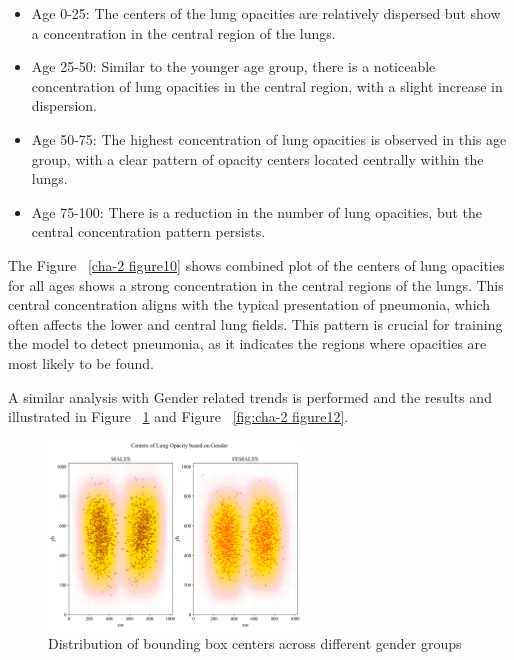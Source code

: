 \begin{itemize}
    \item Age 0-25: The centers of the lung opacities are relatively dispersed but show a concentration in the central region of the lungs.
    \item Age 25-50: Similar to the younger age group, there is a noticeable concentration of lung opacities in the central region, with a slight increase in dispersion.
    \item Age 50-75: The highest concentration of lung opacities is observed in this age group, with a clear pattern of opacity centers located centrally within the lungs.
    \item Age 75-100: There is a reduction in the number of lung opacities, but the central concentration pattern persists.
\end{itemize}

The Figure ~\ref{cha-2 figure10} shows combined plot of the centers of lung opacities for all ages shows a strong concentration in the central regions of the lungs. This central concentration aligns with the typical presentation of pneumonia, which often affects the lower and central lung fields. This pattern is crucial for training the model to detect pneumonia, as it indicates the regions where opacities are most likely to be found.

A similar analysis with Gender related trends is performed and the results and illustrated in Figure ~\ref{fig:cha-2 figure11} and Figure ~\ref{fig:cha-2 figure12}.

\begin{figure}[H]
    \begin{center}
        \includegraphics[width = 0.6\textwidth]{figures/Figure16.png}
        \caption{Distribution of bounding box centers across different gender groups}
        \label{fig:cha-2 figure11}
    \end{center}
\end{figure}

